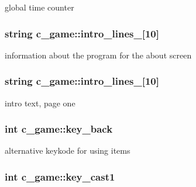 global time counter \hypertarget{classc__game_ab8e5b3f28029051073317880b91af20d}{
\subsubsection[{intro\-\_\-lines\-\_\-1}]{\setlength{\rightskip}{0pt plus 5cm}string c\-\_\-game\-::intro\-\_\-lines\-\_\mbox{[}10\mbox{]}\hspace{0.3cm}{\ttfamily [protected]}}}\label{classc__game_ab8e5b3f28029051073317880b91af20d}
information about the program for the about screen \hypertarget{classc__game_ac61cbd1ddd12e3481780d016b7fc689e}{
\subsubsection[{intro\-\_\-lines\-\_\-2}]{\setlength{\rightskip}{0pt plus 5cm}string c\-\_\-game\-::intro\-\_\-lines\-\_\mbox{[}10\mbox{]}\hspace{0.3cm}{\ttfamily [protected]}}}\label{classc__game_ac61cbd1ddd12e3481780d016b7fc689e}
intro text, page one \hypertarget{classc__game_a2c57b2e7fd7e695208282a8cac2b2070}{
\subsubsection[{key\-\_\-back}]{\setlength{\rightskip}{0pt plus 5cm}int c\-\_\-game\-::key\-\_\-back\hspace{0.3cm}{\ttfamily [protected]}}}\label{classc__game_a2c57b2e7fd7e695208282a8cac2b2070}
alternative keykode for using items \hypertarget{classc__game_a40689f9da4ca424a96497ff916ea0c99}{
\subsubsection[{key\-\_\-cast1}]{\setlength{\rightskip}{0pt plus 5cm}int c\-\_\-game\-::key\-\_\-cast1\hspace{0.3cm}{\ttfamily [protected]}}}\label{classc__game_a40689f9da4ca424a96497ff916ea0c99}
